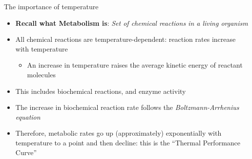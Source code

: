 \begin{frame}{The importance of temperature}

  \begin{itemize}[<+->]\setlength{\itemindent}{0em}\itemsep10pt
    \item {\bf Recall what Metabolism is}: {\it Set of chemical reactions in a living organism}
    \item All chemical reactions are temperature-dependent: reaction rates increase with temperature
    \begin{itemize}
      \item An increase in temperature raises the average kinetic energy of reactant molecules
    \end{itemize}   
    \item This includes biochemical reactions, and enzyme activity
    \item The increase in biochemical reaction rate follows the {\it Boltzmann-Arrhenius equation}
    \item Therefore, metabolic rates go up (approximately) exponentially with temperature to a point and then decline: this is the ``Thermal Performance Curve''
  \end{itemize}
  
  \end{frame}

